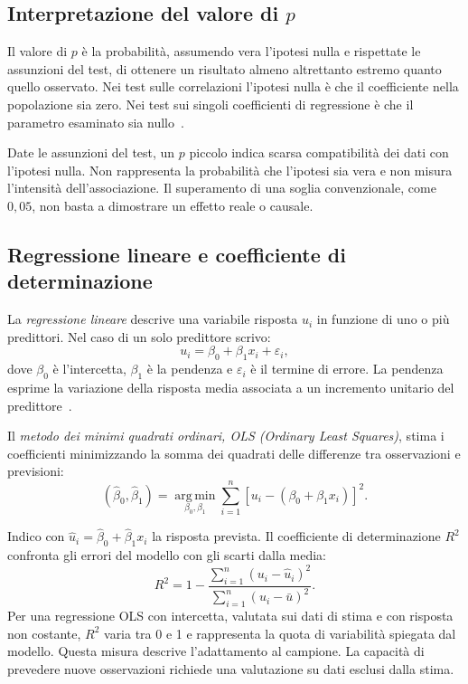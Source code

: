 \subsection{Interpretazione del valore di \texorpdfstring{$p$}{p}}
\label{subsec:materiali-p-value}

Il valore di \emph{$p$} è la probabilità, assumendo vera l'ipotesi nulla e rispettate le assunzioni del test, di ottenere un risultato almeno altrettanto estremo quanto quello osservato. Nei test sulle correlazioni l'ipotesi nulla è che il coefficiente nella popolazione sia zero. Nei test sui singoli coefficienti di regressione è che il parametro esaminato sia nullo~\cite{Wasserstein02042016}.

Date le assunzioni del test, un $p$ piccolo indica scarsa compatibilità dei dati con l'ipotesi nulla. Non rappresenta la probabilità che l'ipotesi sia vera e non misura l'intensità dell'associazione. Il superamento di una soglia convenzionale, come $0{,}05$, non basta a dimostrare un effetto reale o causale.

\subsection{Regressione lineare e coefficiente di determinazione}
\label{subsec:materiali-ols}

La \emph{regressione lineare} descrive una variabile risposta $u_i$ in funzione di uno o più predittori. Nel caso di un solo predittore scrivo:
\begin{equation}
    u_i=\beta_0+\beta_1x_i+\varepsilon_i,
    \label{eq:materiali-ols}
\end{equation}
dove $\beta_0$ è l'intercetta, $\beta_1$ è la pendenza e $\varepsilon_i$ è il termine di errore. La pendenza esprime la variazione della risposta media associata a un incremento unitario del predittore~\cite{James2013}.

Il \emph{metodo dei minimi quadrati ordinari, OLS (Ordinary Least Squares)}, stima i coefficienti minimizzando la somma dei quadrati delle differenze tra osservazioni e previsioni:
\begin{equation}
    (\widehat{\beta}_0,\widehat{\beta}_1)
    =\operatorname*{arg\,min}_{\beta_0,\beta_1}
    \sum_{i=1}^{n}\left[u_i-(\beta_0+\beta_1x_i)\right]^2.
    \label{eq:materiali-minimi-quadrati}
\end{equation}

Indico con $\widehat{u}_i=\widehat{\beta}_0+\widehat{\beta}_1x_i$ la risposta prevista. Il coefficiente di determinazione $R^2$ confronta gli errori del modello con gli scarti dalla media:
\begin{equation}
    R^2=1-\frac{\sum_{i=1}^{n}(u_i-\widehat{u}_i)^2}
    {\sum_{i=1}^{n}(u_i-\bar{u})^2}.
    \label{eq:materiali-r-quadro}
\end{equation}
Per una regressione OLS con intercetta, valutata sui dati di stima e con risposta non costante, $R^2$ varia tra 0 e 1 e rappresenta la quota di variabilità spiegata dal modello. Questa misura descrive l'adattamento al campione. La capacità di prevedere nuove osservazioni richiede una valutazione su dati esclusi dalla stima.

